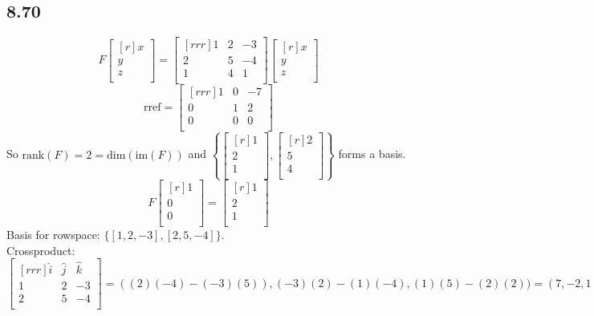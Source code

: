 \documentclass{report}
\theoremstyle{plain}
\theoremstyle{definition}
\theoremstyle{plain}
\begin{document}
\subsection{8.70}
\[ F\begin{bmatrix}[r]x\\y\\z\\\end{bmatrix}=\begin{bmatrix}[rrr]1&2&-3\\2&5&-4\\1&4&1\\\end{bmatrix}\begin{bmatrix}[r]x\\y\\z\\\end{bmatrix} \]
\[ \mathrm{rref}=\begin{bmatrix}[rrr]1&0&-7\\0&1&2\\0&0&0\\\end{bmatrix} \]
So $\mathrm{rank}(F)=2=\mathrm{dim}(\mathrm{im}(F))$ and $\left \{\begin{bmatrix}[r]1\\2\\1\\\end{bmatrix},\begin{bmatrix}[r]2\\5\\4\\\end{bmatrix}\right\}$ forms a basis.\\
\[ F\begin{bmatrix}[r]1\\0\\0\\\end{bmatrix}=\begin{bmatrix}[r]1\\2\\1\\\end{bmatrix} \]
Basis for rowspace: $\{[1,2,-3],[2,5,-4]\}$.\\
Crossproduct:
\[ \begin{bmatrix}[rrr]\hat{i} & \hat{j} & \hat{k}\\1&2&-3\\2&5&-4\\\end{bmatrix}=((2)(-4)-(-3)(5)),(-3)(2)-(1)(-4), (1)(5)-(2)(2)) = (7,-2,1) \]
\end{document}
